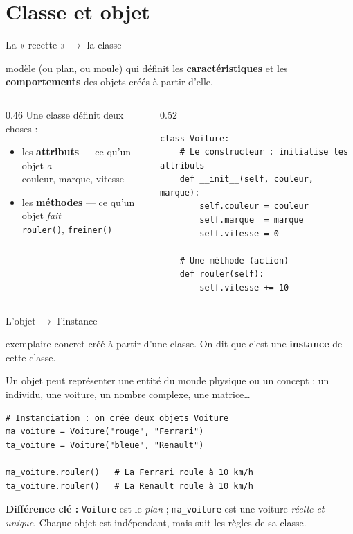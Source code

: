 \documentclass[11pt,aspectratio=169]{beamer}
\newcommand{\py}[1]{\texttt{#1}}
\begin{document}
\section{Classe et objet}

\begin{frame}[fragile]{La « recette » $\rightarrow$ la classe}
  \begin{defi}[Classe]
    modèle (ou plan, ou moule) qui définit les \textbf{caractéristiques} et les
    \textbf{comportements} des objets créés à partir d'elle.
  \end{defi}
  \begin{columns}[T,onlytextwidth]
    \begin{column}{0.46\textwidth}
      Une classe définit deux choses :
      \begin{itemize}
        \item les \textbf{attributs} --- ce qu'un objet \emph{a}\\
              {\small couleur, marque, vitesse}
        \item les \textbf{méthodes} --- ce qu'un objet \emph{fait}\\
              {\small \py{rouler()}, \py{freiner()}}
      \end{itemize}
    \end{column}
    \begin{column}{0.52\textwidth}
\begin{lstlisting}
class Voiture:
    # Le constructeur : initialise les attributs
    def __init__(self, couleur, marque):
        self.couleur = couleur
        self.marque  = marque
        self.vitesse = 0

    # Une méthode (action)
    def rouler(self):
        self.vitesse += 10
\end{lstlisting}
    \end{column}
  \end{columns}
\end{frame}

\begin{frame}[fragile,shrink=5]{L'objet $\rightarrow$ l'instance}
  \begin{defi}[Objet]
    exemplaire concret créé à partir d'une classe. On dit que c'est une
    \textbf{instance} de cette classe.
  \end{defi}
  Un objet peut représenter une entité du monde physique ou un concept :
  un individu, une voiture, un nombre complexe, une matrice\dots
\begin{lstlisting}
# Instanciation : on crée deux objets Voiture
ma_voiture = Voiture("rouge", "Ferrari")
ta_voiture = Voiture("bleue", "Renault")

ma_voiture.rouler()   # La Ferrari roule à 10 km/h
ta_voiture.rouler()   # La Renault roule à 10 km/h
\end{lstlisting}
  \begin{piege}
    \textbf{Différence clé :} \py{Voiture} est le \emph{plan} ;
    \py{ma\_voiture} est une voiture \emph{réelle et unique}.
    Chaque objet est indépendant, mais suit les règles de sa classe.
  \end{piege}
\end{frame}
\end{document}
